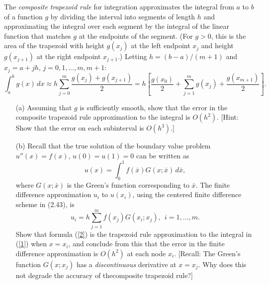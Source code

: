 \documentclass[10pt]{article}
\begin{document}
\begin{problem}
 The {\em composite trapezoid rule} for integration approximates the integral from \(a\) to \(b\) of a function \(g\) by dividing the interval into segments of length \(h\) and approximating the integral over each segment by the integral of the linear function that matches \(g\) at the endpoints of the segment. (For \(g > 0\), this is the area of the trapezoid with height \(g( x_j )\) at the left endpoint \(x_j\) and height \(g( x_{j+1} )\) at the right endpoint \(x_{j+1}\).)  Letting
\(h = (b-a)/(m+1)\) and \(x_j = a + jh\), \(j = 0,1, \ldots , m, m+1\):
\[
\int_a^b g(x)\,dx \approx  h \sum_{j=0}^m \frac{g( x_j )+g( x_{j+1} )}{2} 
     =  h \left[ \frac{g( x_0 )}{2} + \sum_{j=1}^m g( x_j ) + 
                   \frac{g( x_{m+1} )}{2} \right] .
\]

\begin{enumerate}
    \item[(a)] Assuming that \(g\) is sufficiently smooth, show that the error in the composite trapezoid rule approximation to the integral is \(O( h^2 )\). [Hint:  Show that the error on each subinterval is \(O( h^3 )\).]

    \item[(b)] Recall that the true solution of the boundary value problem \(u'' (x) = f(x)\), \(u(0) = u(1) = 0\) can be written as
\begin{equation}
u(x) = \int_0^1 f( \bar{x} ) G(x; \bar{x} )\,d \bar{x} , \label{1}
\end{equation}
where \(G(x; \bar{x})\) is the Green's function corresponding to \(\bar{x}\).  The finite difference approximation \(u_i\) to \(u( x_i )\), using the centered finite difference scheme in (2.43), is
\begin{equation}
u_i = h \sum_{j=1}^m f( x_j ) G( x_i ; x_j ) ,~~i=1, \ldots , m . \label{2}
\end{equation}
Show that formula (\ref{2}) is the trapezoid rule approximation to the integral in (\ref{1}) when \(x = x_i\), and conclude from this that the 
error in the finite difference approximation is \(O( h^2 )\) at each node \(x_i\). [Recall:  The Green's function \(G( x ; x_j )\) has a {\em discontinuous} derivative at \(x = x_j\).  Why does this not degrade the accuracy of thecomposite trapezoid rule?]
\end{enumerate}
\end{problem}
\end{document}
